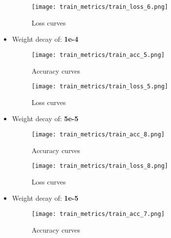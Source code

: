 \documentclass{article}
\begin{document}
\begin{itemize}
\begin{figure}[H]
\begin{minipage}{.5\linewidth}
    \end{minipage}%
    \begin{minipage}{.5\textwidth}
      \centering
      \texttt{[image: train\_metrics/train\_loss\_6.png]}
      \vspace{-1.0em}
      \caption{Loss curves}

    \end{minipage}
    \end{figure}
    
    \newpage    
    \item Weight decay of: \textbf{1e-4}
    \begin{figure}[H]
    \centering
    \begin{minipage}{.5\linewidth}
        \centering
        \texttt{[image: train\_metrics/train\_acc\_5.png]}
        \vspace{-1.0em}
        \caption{Accuracy curves}

    \end{minipage}%
    \begin{minipage}{.5\textwidth}
      \centering
      \texttt{[image: train\_metrics/train\_loss\_5.png]}
      \vspace{-1.0em}
      \caption{Loss curves}

    \end{minipage}
    \end{figure}

    \item Weight decay of: \textbf{5e-5}
    \begin{figure}[H]
    \centering
    \begin{minipage}{.5\linewidth}
        \centering
        \texttt{[image: train\_metrics/train\_acc\_8.png]}
        \vspace{-1.0em}
        \caption{Accuracy curves}

    \end{minipage}%
    \begin{minipage}{.5\textwidth}
      \centering
      \texttt{[image: train\_metrics/train\_loss\_8.png]}
      \vspace{-1.0em}
      \caption{Loss curves}

    \end{minipage}
    \end{figure}
    
    \item Weight decay of: \textbf{1e-5}
    \begin{figure}[H]
    \centering
    \begin{minipage}{.5\linewidth}
        \centering
        \texttt{[image: train\_metrics/train\_acc\_7.png]}
        \vspace{-1.0em}
        \caption{Accuracy curves}


\end{minipage}
\end{figure}
\end{itemize}
\end{document}

